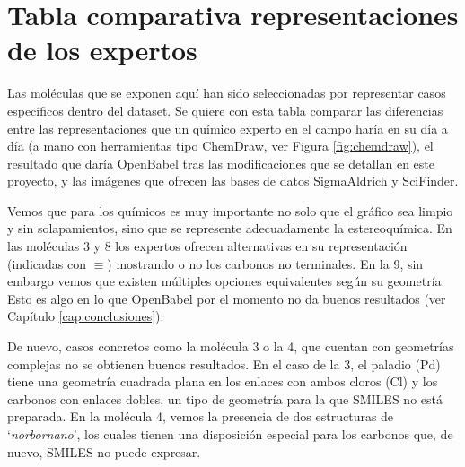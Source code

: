 \chapter{Tabla comparativa representaciones de los expertos}
\label{apend:expertos_dibujos}

Las moléculas que se exponen aquí han sido seleccionadas por representar casos específicos dentro del dataset. Se quiere con esta tabla comparar las diferencias entre las representaciones que un químico experto en el campo haría en su día a día (a mano con herramientas tipo ChemDraw, ver Figura \ref{fig:chemdraw}), el resultado que daría OpenBabel tras las modificaciones que se detallan en este proyecto, y las imágenes que ofrecen las bases de datos SigmaAldrich y SciFinder.

Vemos que para los químicos es muy importante no solo que el gráfico sea limpio y sin solapamientos, sino que se represente adecuadamente la estereoquímica. En las moléculas 3 y 8 los expertos ofrecen alternativas en su representación (indicadas con $\equiv$) mostrando o no los carbonos no terminales. En la 9, sin embargo vemos que existen múltiples opciones equivalentes según su geometría. Esto es algo en lo que OpenBabel por el momento no da buenos resultados (ver Capítulo \ref{cap:conclusiones}).

De nuevo, casos concretos como la molécula 3 o la 4, que cuentan con geometrías complejas no se obtienen buenos resultados. En el caso de la 3, el paladio (Pd) tiene una geometría cuadrada plana en los enlaces con ambos cloros (Cl) y los carbonos con enlaces dobles, un tipo de geometría para la que SMILES no está preparada. En la molécula 4, vemos la presencia de dos estructuras de `\textit{norbornano}', los cuales tienen una disposición especial para los carbonos que, de nuevo, SMILES no puede expresar.



